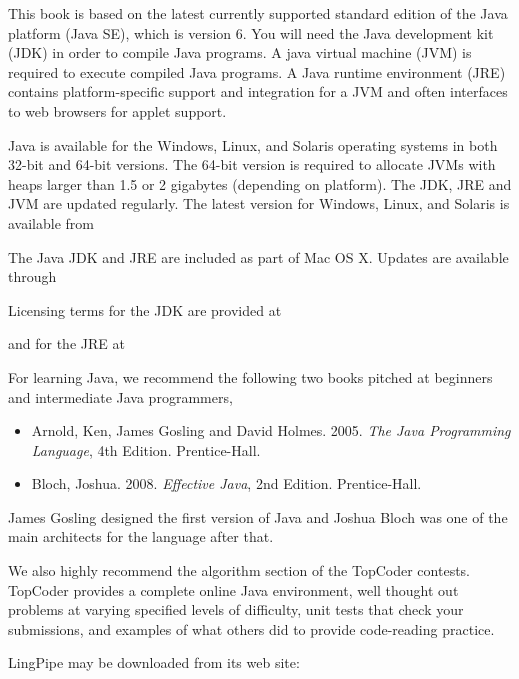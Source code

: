 
\noindent
This book is based on the latest currently supported standard edition
of the Java platform (Java SE), which is version 6.  You will need the
Java development kit (JDK) in order to compile Java programs.  A java
virtual machine (JVM) is required to execute compiled Java programs.
A Java runtime environment (JRE) contains platform-specific support
and integration for a JVM and often interfaces to web browsers for
applet support.


\noindent
Java is available for the Windows, Linux, and Solaris operating
systems in both 32-bit and 64-bit versions.  The 64-bit version is
required to allocate JVMs with heaps larger than 1.5 or 2 gigabytes
(depending on platform).  The JDK, JRE and JVM are updated regularly.
The latest version for Windows, Linux, and Solaris is available from
%
\begin{quote}
\end{quote}
%
The Java JDK and JRE are included as part of Mac OS X.  Updates are
available through
%
\begin{quote}
\end{quote}
%
Licensing terms for the JDK are provided at
%
\begin{quote}
\end{quote}
%
and for the JRE at
%
\begin{quote}
\end{quote}


\noindent
For learning Java, we recommend the following two books pitched at
beginners and intermediate Java programmers,
%
\begin{itemize}
\item Arnold, Ken, James Gosling and David Holmes.  2005.
{\it The Java Programming Language}, 4th Edition.  Prentice-Hall.
\item Bloch, Joshua. 2008. {\it Effective Java}, 2nd Edition.  Prentice-Hall.
\end{itemize}
%
James Gosling designed the first version of Java and Joshua Bloch was
one of the main architects for the language after that.

We also highly recommend the algorithm section of the TopCoder
contests.  TopCoder provides a complete online Java environment, well
thought out problems at varying specified levels of difficulty, unit
tests that check your submissions, and examples of what others did to
provide code-reading practice.
%
\begin{quote}
\end{quote}
%






\noindent
LingPipe may be downloaded from its web site:

\begin{quote}
\end{quote}
